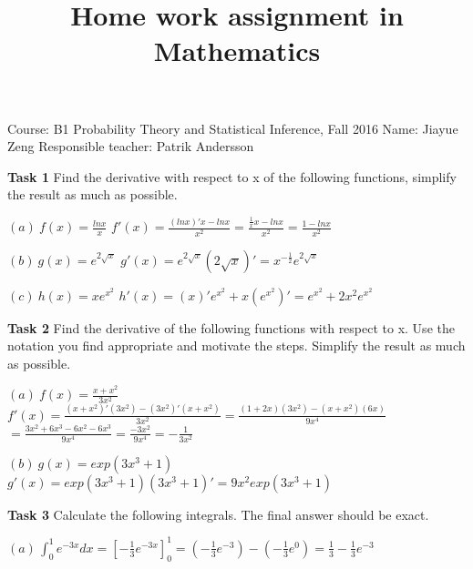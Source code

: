 \documentclass[a4paper,11pt,fleqn]{article}
\title{Home work assignment in Mathematics }
\begin{document}
\maketitle
\large  Course: B1 Probability Theory and Statistical Inference, Fall 2016 
\vskip 1.0cm
Name: Jiayue Zeng
\vskip 1.0cm
Responsible teacher: Patrik Andersson 




\newpage
\textbf{Task 1}
\vskip 0.5cm
Find the derivative with respect to x of the following functions, simplify the result as much as possible.

\vskip 0.5cm
$ \left( a \right) \ f \left( x \right) = \frac{lnx}{x}$ 
\vskip 0.5cm
\qquad $ f' \left( x \right) =\frac{\left(lnx\right)'x-lnx}{x^2}= \frac{\frac{1}{x} x-lnx}{x^2} =\frac{1-lnx}{x^2}  $ 

\vskip 0.5cm
$\left( b \right) \ g \left( x \right) = e^{2\sqrt x}  $
\vskip 0.5cm
\qquad $ g' \left( x \right) = e^{2\sqrt x} \left(2\sqrt x \right)'=x^{-\frac{1}{2}}e^{2\sqrt x}  $

\vskip 0.5cm
$\left( c \right) \ h \left( x \right) = xe^{x^2} $
\vskip 0.5cm
\qquad $ h' \left( x \right) = \left(x\right)'e^{x^2}+x\left(e^{x^2}\right)'=e^{x^2}+2x^2e^{x^2}  $

\vskip 0.7cm



\textbf{Task 2}
\vskip 0.5cm
Find the derivative of the following functions with respect to x. Use the notation you find appropriate and motivate the steps. Simplify the result as much as possible.

\vskip 0.5cm
$ \left( a \right) \ f \left( x \right) = \frac{x+x^2}{3x^2}$ 
\vskip 0.5cm
\qquad $ f' \left( x \right) =\frac{\left(x+x^2\right)'\left(3x^2\right)-\left(3x^2\right)'\left(x+x^2\right)}{3x^2}=\frac{\left(1+2x\right)(3x^2)-(x+x^2)(6x)}{9x^4} $
\vskip 0.5cm
\qquad \qquad \;   $=\frac{3x^2+6x^3-6x^2-6x^3}{9x^4}=\frac{-3x^2}{9x^4}=-\frac{1}{3x^2}   $ 

\vskip 0.5cm
$\left( b \right) \ g \left( x \right) = exp(3x^3+1)  $
\vskip 0.5cm
\qquad $ g' \left( x \right) = exp(3x^3+1)(3x^3+1)' = 9x^2exp(3x^3 +1)  $



\newpage

\textbf{Task 3}
\vskip 0.5cm
Calculate the following integrals. The final answer should be exact. 
\vskip 0.5cm

$\left( a \right) \, \int_{0}^{1} e^{-3x}dx = [-\frac{1}{3}e^{-3x}]_0^1 = (-\frac{1}{3} e^{-3})-(-\frac{1}{3}e^0) = \frac{1}{3}-\frac{1}{3}e^{-3}  $
\vskip 0.5cm
\end{document}
